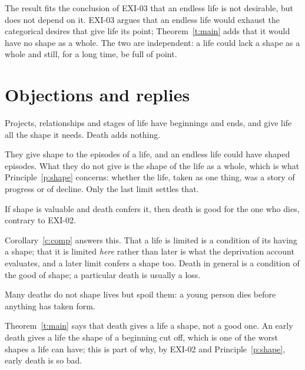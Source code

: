 \documentclass{situationist-preprint}
\begin{document}
The result fits the conclusion of EXI-03 that an endless life is not desirable, but does not depend on it. EXI-03 argues that an endless life would exhaust the categorical desires that give life its point; Theorem~\ref{t:main} adds that it would have no shape as a whole. The two are independent: a life could lack a shape as a whole and still, for a long time, be full of point.

\section{Objections and replies}

\begin{objection}\label{o:other}
Projects, relationships and stages of life have beginnings and ends, and give life all the shape it needs. Death adds nothing.
\end{objection}

\begin{reply}
They give shape to the episodes of a life, and an endless life could have shaped episodes. What they do not give is the shape of the life as a whole, which is what Principle~\ref{p:shape} concerns: whether the life, taken as one thing, was a story of progress or of decline. Only the last limit settles that.
\end{reply}

\begin{objection}\label{o:good}
If shape is valuable and death confers it, then death is good for the one who dies, contrary to EXI-02.
\end{objection}

\begin{reply}
Corollary~\ref{c:comp} answers this. That a life is limited is a condition of its having a shape; that it is limited \emph{here} rather than later is what the deprivation account evaluates, and a later limit confers a shape too. Death in general is a condition of the good of shape; a particular death is usually a loss.
\end{reply}

\begin{objection}\label{o:ruin}
Many deaths do not shape lives but spoil them: a young person dies before anything has taken form.
\end{objection}

\begin{reply}
Theorem~\ref{t:main} says that death gives a life a shape, not a good one. An early death gives a life the shape of a beginning cut off, which is one of the worst shapes a life can have; this is part of why, by EXI-02 and Principle~\ref{p:shape}, early death is so bad.
\end{reply}
\end{document}
